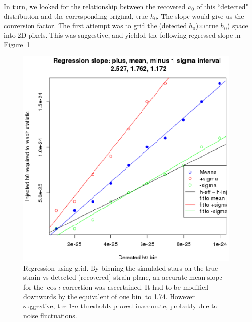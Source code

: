In turn, we looked for the relationship between the recovered $h_0$ of this ``detected" distribution and the corresponding original, true $h_0$. The slope would give us the conversion factor. The first attempt was to grid the (detected $h_0$)$\times$(true $h_0$) space into 2D pixels. This was suggestive, and yielded the following regressed slope in Figure~\ref{fig:plotheffvsh0trueregressions}

\begin{figure}
\begin{center}
\includegraphics[width=0.5\paperwidth,height=0.35\paperheight]{PlotHeffVsH0TrueRegressions.eps}
\caption{Regression using grid. By binning the simulated stars on the true strain vs detected (recovered) strain plane, an accurate mean slope for the $\cos \iota$ correction was ascertained. It had to be modified downwards by the equivalent of one bin, to 1.74. However suggestive, the 1-$\sigma$ thresholds proved inaccurate, probably due to noise fluctuations.
\label{fig:plotheffvsh0trueregressions}}
\end{center}
\end{figure}


